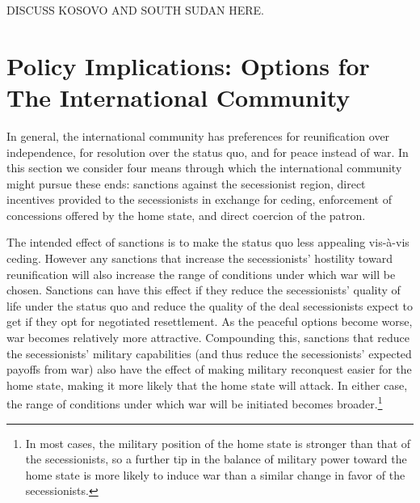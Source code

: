 \documentclass[12pt,letterpaper, notitlepage]{article}
\begin{document}
DISCUSS KOSOVO AND SOUTH SUDAN HERE.


\section*{Policy Implications: Options for The International Community}
 In general, the international community has preferences for reunification over independence, for resolution over the status quo, and for peace instead of war.  In this section we consider  four means through which the international community might pursue these ends: sanctions against the secessionist region, direct incentives provided to the secessionists in exchange for ceding, enforcement of concessions offered by the home state, and direct coercion of the patron.

The intended effect of sanctions is to make the status quo less appealing vis-\`{a}-vis ceding. However any sanctions that increase the secessionists' hostility toward reunification will also increase the range of conditions under which war will be chosen.  Sanctions can have this effect if they reduce the secessionists' quality of life under the status quo %
and reduce the quality of the deal secessionists expect to get if they opt for negotiated resettlement. As the peaceful options become worse, war becomes relatively more attractive.
 Compounding this, sanctions that reduce the secessionists' military capabilities (and thus reduce the secessionists' expected payoffs from war) also have the effect of making military reconquest easier for the home state, making it more likely that the home state will attack. In either case, the range of conditions under which war will be initiated becomes broader.\footnote{In most cases, the military position of the home state is stronger than that of the secessionists, so a further tip in the balance of military power toward the home state is more likely to induce war than a similar change in favor of the secessionists.}

\end{document}

